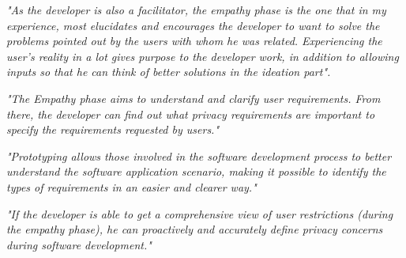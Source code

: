 \documentclass[conference]{IEEEtran}
\begin{document}
\begin{mq}
\emph{"As the developer is also a facilitator, the empathy phase is the one that in my experience, most elucidates and encourages the developer to want to solve the problems pointed out by the users with whom he was related. Experiencing the user's reality in a lot gives purpose to the developer work, in addition to allowing inputs so that he can think of better solutions in the ideation part".}
\end{mq}

\begin{mq}
\emph{"The Empathy phase aims to understand and clarify user requirements. From there, the developer can find out what privacy requirements are important to specify the requirements requested by users."}
\end{mq}

\begin{mq}
\emph{"Prototyping allows those involved in the software development process to better understand the software application scenario, making it possible to identify the types of requirements in an easier and clearer way."}
\end{mq}

\begin{mq}
\emph{"If the developer is able to get a comprehensive view of user restrictions (during the empathy phase), he can proactively and accurately define privacy concerns during software development."}
\end{mq}
\end{document}

